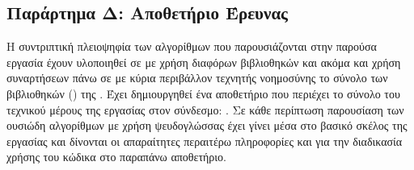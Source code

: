 \begin{appendices}
        \section*{Παράρτημα Δ: Αποθετήριο Έρευνας}
        Η συντριπτική πλειοψηφία των αλγορίθμων που παρουσιάζονται στην παρούσα εργασία έχουν υλοποιηθεί σε  με χρήση διαφόρων βιβλιοθηκών και ακόμα και χρήση συναρτήσεων πάνω σε  με κύρια περιβάλλον τεχνητής νοημοσύνης το σύνολο των βιβλιοθηκών () της . Έχει δημιουργηθεί ένα αποθετήριο που περιέχει το σύνολο του τεχνικού μέρους της εργασίας στον σύνδεσμο: \small{}. Σε κάθε περίπτωση παρουσίαση των ουσιώδη αλγορίθμων με χρήση ψευδογλώσσας έχει γίνει μέσα στο βασικό σκέλος της εργασίας και 
        δίνονται οι απαραίτητες περαιτέρω πληροφορίες και για την διαδικασία χρήσης του κώδικα στο παραπάνω αποθετήριο.

\end{appendices}


